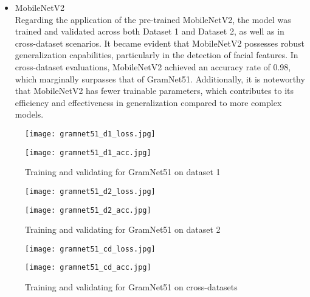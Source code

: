 \documentclass[rebuttal]{cvpr}
\begin{document}
\begin{itemize}
        \item MobileNetV2 \\
         Regarding the application of the pre-trained MobileNetV2, the model was trained and validated across both Dataset 1 and Dataset 2, as well as in cross-dataset scenarios. It became evident that MobileNetV2 possesses robust generalization capabilities, particularly in the detection of facial features. In cross-dataset evaluations, MobileNetV2 achieved an accuracy rate of 0.98, which marginally surpasses that of GramNet51. Additionally, it is noteworthy that MobileNetV2 has fewer trainable parameters, which contributes to its efficiency and effectiveness in generalization compared to more complex models.
\end{itemize}

\begin{figure*}[t]
\centering
\begin{minipage}{0.45\linewidth}
   \texttt{[image: gramnet51\_d1\_loss.jpg]}
   \label{fig:image1}
\end{minipage}
\hfill
\begin{minipage}{0.45\linewidth}
   \texttt{[image: gramnet51\_d1\_acc.jpg]}
   \label{fig:image2}
\end{minipage}
\caption{Training and validating for GramNet51 on dataset 1}
\label{fig:dataset}
\end{figure*}

\begin{figure*}[t]
\centering
\begin{minipage}{0.45\linewidth}
   \texttt{[image: gramnet51\_d2\_loss.jpg]}
   \label{fig:image1}
\end{minipage}
\hfill
\begin{minipage}{0.45\linewidth}
   \texttt{[image: gramnet51\_d2\_acc.jpg]}
   \label{fig:image2}
\end{minipage}
\caption{Training and validating for GramNet51 on dataset 2}
\label{fig:dataset}
\end{figure*}

\begin{figure*}[t]
\centering
\begin{minipage}{0.45\linewidth}
   \texttt{[image: gramnet51\_cd\_loss.jpg]}
   \label{fig:image1}
\end{minipage}
\hfill
\begin{minipage}{0.45\linewidth}
   \texttt{[image: gramnet51\_cd\_acc.jpg]}
   \label{fig:image2}
\end{minipage}
\caption{Training and validating for GramNet51 on cross-datasets}
\label{fig:dataset}
\end{figure*}
\end{document}
